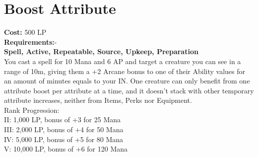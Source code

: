 \section{Boost Attribute}\label{spell:boostAttribute}
\textbf{Cost:} 500 LP\\
\textbf{Requirements:}-\\
\textbf{Spell, Active, Repeatable, Source, Upkeep, Preparation}\\
You cast a spell for 10 Mana and 6 AP and target a creature you can see in a range of 10m, giving them a +2 Arcane bonus to one of their Ability values for an amount of minutes equals to your IN.
One creature can only benefit from one attribute boost per attribute at a time, and it doesn't stack with other temporary attribute increases, neither from Items, Perks nor Equipment.
\\
Rank Progression:\\
II: 1,000 LP, bonus of +3 for 25 Mana\\
III: 2,000 LP, bonus of +4 for 50 Mana\\
IV: 5,000 LP, bonus of +5 for 80 Mana\\
V: 10,000 LP, bonus of +6 for 120 Mana\\